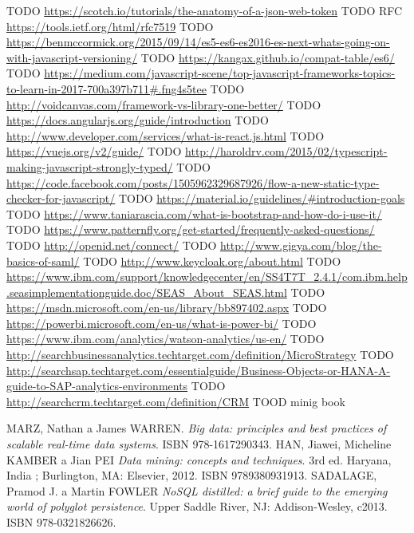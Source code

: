 \begin{thebibliography}{99}
TODO \url{https://scotch.io/tutorials/the-anatomy-of-a-json-web-token}
TODO RFC \url{https://tools.ietf.org/html/rfc7519}
TODO \url{https://benmccormick.org/2015/09/14/es5-es6-es2016-es-next-whats-going-on-with-javascript-versioning/}
TODO \url{https://kangax.github.io/compat-table/es6/}
TODO \url{https://medium.com/javascript-scene/top-javascript-frameworks-topics-to-learn-in-2017-700a397b711#.fng4s5tee}
TODO \url{http://voidcanvas.com/framework-vs-library-one-better/}
TODO \url{https://docs.angularjs.org/guide/introduction}
TODO \url{http://www.developer.com/services/what-is-react.js.html}
TODO \url{https://vuejs.org/v2/guide/}
TODO \url{http://haroldrv.com/2015/02/typescript-making-javascript-strongly-typed/}
TODO \url{https://code.facebook.com/posts/1505962329687926/flow-a-new-static-type-checker-for-javascript/}
TODO \url{https://material.io/guidelines/#introduction-goals}
TODO \url{https://www.taniarascia.com/what-is-bootstrap-and-how-do-i-use-it/}
TODO \url{https://www.patternfly.org/get-started/frequently-asked-questions/}
TODO \url{http://openid.net/connect/}
TODO \url{http://www.gigya.com/blog/the-basics-of-saml/}
TODO \url{http://www.keycloak.org/about.html}
TODO \url{ https://www.ibm.com/support/knowledgecenter/en/SS4T7T_2.4.1/com.ibm.help.seasimplementationguide.doc/SEAS_About_SEAS.html}
TODO \url{https://msdn.microsoft.com/en-us/library/bb897402.aspx}
TODO \url{https://powerbi.microsoft.com/en-us/what-is-power-bi/}
TODO \url{https://www.ibm.com/analytics/watson-analytics/us-en/}
TODO \url{http://searchbusinessanalytics.techtarget.com/definition/MicroStrategy}
TODO \url{http://searchsap.techtarget.com/essentialguide/Business-Objects-or-HANA-A-guide-to-SAP-analytics-environments}
TODO \url{http://searchcrm.techtarget.com/definition/CRM}
TOOD minig book

MARZ, Nathan a James WARREN.
\textit{Big data: principles and best practices of scalable real-time data systems}.
ISBN 978-1617290343.
HAN, Jiawei, Micheline KAMBER a Jian PEI
\textit{Data mining: concepts and techniques}.
3rd ed. Haryana, India ; Burlington, MA: Elsevier, 2012. ISBN 9789380931913.
SADALAGE, Pramod J. a Martin FOWLER
\textit{NoSQL distilled: a brief guide to the emerging world of polyglot persistence}.
Upper Saddle River, NJ: Addison-Wesley, c2013. ISBN 978-0321826626.

\end{thebibliography}
